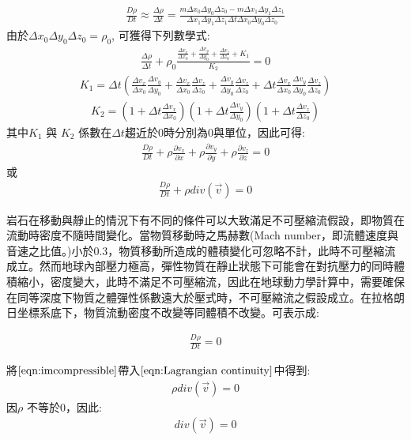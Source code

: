\begin{align}
\frac{D\rho}{Dt} \approx \frac{\Delta \rho}{\Delta t} =\frac{m\Delta x_0 \Delta y_0 \Delta z_0-m\Delta x_1 \Delta y_1 \Delta z_1}{\Delta x_1 \Delta y_1 \Delta z_1\Delta t\Delta x_0 \Delta y_0 \Delta z_0}\label{eqn:Drho-Dt2}
\end{align}
由於$\Delta x_0 \Delta y_0 \Delta z_0=\rho_0$, 可獲得下列數學式:
\begin{align}
\frac{\Delta \rho}{\Delta t}+\rho_0\frac{\frac{\Delta v_x}{\Delta x_0}+\frac{\Delta v_y}{\Delta y_0}+\frac{\Delta v_z}{\Delta z_0}+K_1}{K_2} = 0
\end{align}
\begin{align}
K_1 = \Delta t(\frac{\Delta v_x}{\Delta x_0}\frac{\Delta v_y}{\Delta y_0}+\frac{\Delta v_x}{\Delta x_0}\frac{\Delta v_z}{\Delta z_0}+\frac{\Delta v_y}{\Delta y_0}\frac{\Delta v_z}{\Delta z_0}+\Delta t \frac{\Delta v_x}{\Delta x_0}\frac{\Delta v_y}{\Delta y_0}\frac{\Delta v_z}{\Delta z_0})
\end{align}
\begin{align}
K_2=(1+\Delta t\frac{\Delta v_x}{\Delta x_0})(1+\Delta t\frac{\Delta v_y}{\Delta y_0})(1+\Delta t\frac{\Delta v_z}{\Delta z_0})
\end{align}
其中$K_1$ 與 $K_2$ 係數在$\Delta t$趨近於$0$時分別為$0$與單位，因此可得:
\begin{align}
\frac{D\rho}{Dt}+\rho\frac{\partial v_x}{\partial x}+\rho\frac{\partial v_y}{\partial y}+\rho\frac{\partial v_z}{\partial z} = 0
\end{align}
或
\begin{align}
\frac{D\rho}{Dt}+\rho div(\vec v) = 0 \label{eqn:Lagrangian continuity}
\end{align}

岩石在移動與靜止的情況下有不同的條件可以大致滿足不可壓縮流假設，即物質在流動時密度不隨時間變化。當物質移動時之馬赫數(Mach number，即流體速度與音速之比值。)小於0.3，物質移動所造成的體積變化可忽略不計，此時不可壓縮流成立。然而地球內部壓力極高，彈性物質在靜止狀態下可能會在對抗壓力的同時體積縮小，密度變大，此時不滿足不可壓縮流，因此在地球動力學計算中，需要確保在同等深度下物質之體彈性係數遠大於壓式時，不可壓縮流之假設成立。在拉格朗日坐標系底下，物質流動密度不改變等同體積不改變。可表示成:

\begin{align}
\frac{D\rho}{Dt} = 0 \label{eqn:imcompressible}
\end{align}

將$\ref{eqn:imcompressible}$帶入$\ref{eqn:Lagrangian continuity}$中得到:
\begin{align}
\rho div(\vec v) = 0
\end{align}
因$\rho$ 不等於0，因此:
\begin{align}
div(\vec v) = 0 
\end{align}

